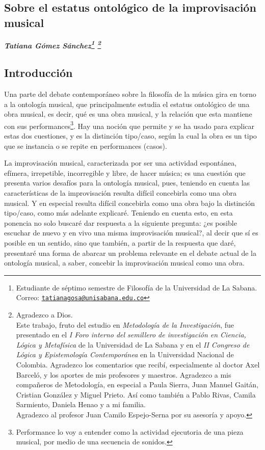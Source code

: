 \documentclass[]{book}
\newcommand{\autor}[1]{            %
  \begin{center}                   %
    \vspace*{-3.5em}               %
    \textbf{\textit{\large #1}}    %
    \vspace*{+4em}                 %
  \end{center}
}
\begin{document}
\begin{refsection}
\chapter{\texorpdfstring{\textbf{Sobre el estatus ontológico de la improvisación musical}}{Sobre el estatus ontológico de la improvisación musical}}\label{sobre-el-estatus-ontológico-de-la-improvisación-musical}

\autor{Tatiana Gómez Sánchez\footnote{Estudiante de séptimo semestre de
		Filosofía de la Universidad de La Sabana. Correo:
		\href{mailto:tatianagosa@unisabana.edu.co}{\nolinkurl{tatianagosa@unisabana.edu.co}}} \footnote{Agradezco a Dios.\\
		Este trabajo, fruto del estudio en \textit{Metodología de la Investigación}, fue presentado en el \textit{I Foro interno del semillero de investigación en Ciencia, Lógica y Metafísica} de la Universidad de La Sabana y en el \textit{II Congreso de Lógica y Epistemología Contemporánea} en la Universidad Nacional de Colombia. Agradezco los comentarios que recibí, especialmente al doctor Axel Barceló, y los aportes de mis profesores y maestros. Agradezco a mis compañeros de Metodología, en especial a Paula Sierra, Juan Manuel Gaitán, Cristian González y Miguel Prieto. Así como también a Pablo Rivas, Camila Sarmiento, Daniela Henao y a mi familia.\\
		Agradezco al profesor Juan Camilo Espejo-Serna por su asesoría y apoyo.}}

\section*{Introducción}

Una parte del debate contemporáneo sobre la filosofía de la música gira
en torno a la ontología musical, que principalmente estudia el estatus
ontológico de una obra musical, es decir, qué es una obra musical, y la
relación que esta mantiene con sus performances\footnote{Performance lo
  voy a entender como la actividad ejecutoria de una pieza musical, por
  medio de una secuencia de sonidos.}. Hay una noción que permite y se
ha usado para explicar estas dos cuestiones, y es la distinción
tipo/caso, según la cual la obra es un tipo que se instancia o se repite
en performances (casos).

La improvisación musical, caracterizada por ser una actividad
espontánea, efímera, irrepetible, incorregible y libre, de hacer música;
es una cuestión que presenta varios desafíos para la ontología musical,
pues, teniendo en cuenta las características de la improvisación resulta
difícil concebirla como una obra musical. Y en especial resulta difícil
concebirla como una obra bajo la distinción tipo/caso, como más adelante
explicaré. Teniendo en cuenta esto, en esta ponencia no solo buscaré dar
respuesta a la siguiente pregunta: ¿es posible escuchar de nuevo y en
vivo una misma improvisación musical?, al decir que sí es posible en un
sentido, sino que también, a partir de la respuesta que daré, presentaré
una forma de abarcar un problema relevante en el debate actual de la
ontología musical, a saber, concebir la improvisación musical como una
obra.


\end{refsection}
\end{document}
